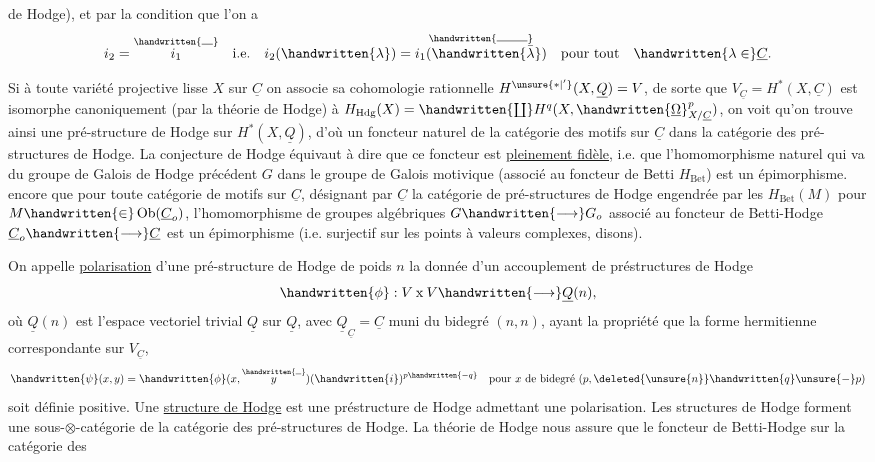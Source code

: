 %
de Hodge), et par la condition que l'on a
\[
i_2=\overset{\handwritten{\rule{0.8em}{0.4pt}}}{i_1}\quad\text{i.e.}\quad i_2(\handwritten{\lambda})=\overset{\handwritten{\rule{2.2em}{0.4pt}}}{i_1(\handwritten{\bar{\lambda}})}\quad\text{pour tout}\quad\handwritten{\lambda\in}\underline{C}.
\]

Si à toute variété projective lisse $X$ sur $\underline{C}$ on associe sa cohomologie rationnelle $H^{\unsure{*|'}}(X,\underline{Q})=V$, de sorte que $V_{\underline{C}}=H^*(X,\underline{C})$ est isomorphe canoniquement (par la théorie de Hodge) à $H_{\mathrm{Hdg}}(X)=\handwritten{\coprod}H^q(X,\handwritten{\underline{\Omega}}^p_{X/\underline{C}})$, on voit qu'on trouve ainsi une pré-structure de Hodge sur $H^*(X,\underline{Q})$, d'où un \inserted{$\unsure{\otimes|\Omega}$-}foncteur naturel de la catégorie des motifs sur $\underline{C}$ dans la catégorie des pré-structures de Hodge. La conjecture de Hodge  équivaut à dire que ce foncteur est \uline{pleinement fidèle}, i.e. que l'homomorphisme naturel qui va du groupe de Galois de Hodge précédent $G$ dans le groupe de Galois motivique (associé au \inserted{$\otimes$-}foncteur de Betti $H_{\mathrm{Bet}}$) est un épimorphisme.  encore que pour toute catégorie   de motifs sur $\underline{C}$, désignant par $\underline{C}$ la \inserted{$\otimes$-}catégorie de pré-structures de Hodge engendrée par  les $H_{\mathrm{Bet}}(M)$ pour $M\handwritten{\in}\operatorname{Ob}(\underline{C}_o)$, l'homomorphisme de groupes algébriques $G\handwritten{\longrightarrow}G_o$ associé au foncteur de Betti-Hodge $\underline{C}_o\handwritten{\longrightarrow}\underline{C}$ est un épimorphisme (i.e. surjectif sur les points à valeurs complexes, disons).

On appelle  \uline{polarisation} d'une pré-structure de Hodge de poids $n$ la donnée d'un accouplement de préstructures de Hodge
\[
\handwritten{\phi}:V\mathbin{\mathrm{x}}V\handwritten{\longrightarrow}\underline{Q}(n),
\]
où $\underline{Q}(n)$ est l'espace vectoriel trivial $\underline{Q}$ sur $\underline{Q}$, avec $\underline{Q}_{\underline{C}}=\underline{C}$ muni du  bidegré $(n,n)$, ayant la propriété que la forme hermitienne correspondante sur $V_{\underline{C}}$,
\margin{\handwritten{\uline{$\unsure{\psi|\phi}$}}}
\[
\handwritten{\psi}(x,y)=\handwritten{\phi}(x,\overset{\handwritten{\rule{0.5em}{0.4pt}}}{y})(\handwritten{i})^{p\handwritten{-q}}\quad\text{pour }x\text{ de bidegré }(p,\deleted{\unsure{n}}\handwritten{q}\unsure{-}p)
\]
soit définie positive. Une \uline{structure de Hodge} est une préstructure de Hodge admettant une polarisation. Les structures de Hodge forment une sous-$\otimes$-catégorie de la catégorie des pré-structures de Hodge. La théorie de Hodge nous assure que le foncteur de Betti-Hodge sur la catégorie des
